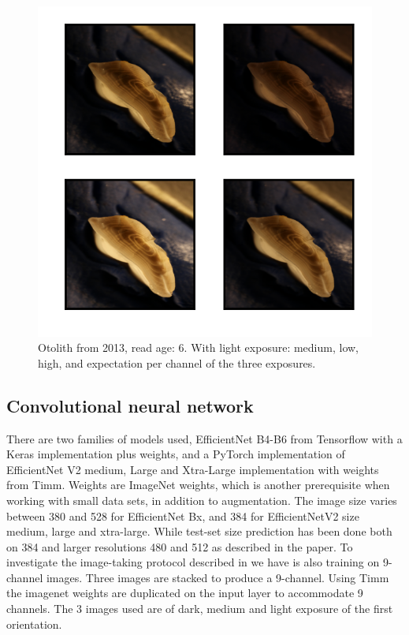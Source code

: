 \documentclass[10pt,letterpaper]{article}
\begin{document}
\begin{figure}[h!]
  \caption{Otolith from 2013, read age: 6. With light exposure: medium, low, high, 
  and expectation per channel of the three exposures. }
  \centering
  \includegraphics[scale=0.015]{otolith/2013_70174_Nr06_age09_IMG_0031_32_33.png}
  
  \label{marker1}
\end{figure}

\subsection*{Convolutional neural network}

There are two families of models used, EfficientNet B4-B6 \citep{EfficientNet}   from Tensorflow \citep{abadi2016tensorflow} with a Keras  \citep{keras} implementation plus weights, and a PyTorch \citep{PyTorch}  implementation of EfficientNet V2 medium, Large 
and Xtra-Large \citep{EfficientNetV2} implementation with weights from Timm\citep{Timm}. Weights are ImageNet \citep{imagenet} weights, which is another prerequisite when working with small data sets, in addition to augmentation. The image size varies between 380 and 528 for EfficientNet Bx, and 384 for EfficientNetV2 size medium, large and xtra-large. While test-set size prediction has been done both on 384 and larger resolutions 480 and 512 as described in the paper. To investigate the image-taking protocol described in \citep{codImageProtocol} we have is also training on 9-channel images. Three images are stacked to produce a 9-channel. Using Timm\citep{Timm} the imagenet weights are duplicated on the input layer to accommodate 9 channels. The 3 images used are of dark, medium and light exposure of the first orientation.
\end{document}
